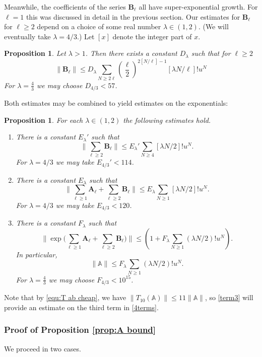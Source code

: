 \documentclass[12pt]{amsart}
\newtheorem{prop}[thm]{Proposition}
\theoremstyle{definition}
\numberwithin{equation}{section}
\newcommand{\bA}{\mathbf{A}}
\newcommand{\bB}{\mathbf{B}}
\theoremstyle{definition} %
\theoremstyle{remark}
\begin{document}
Meanwhile, the coefficients of the series $\bB_\ell$ all have super-exponential growth. For $\ell=1$ this was discussed in detail in the previous section.
Our estimates for $\bB_\ell$ for $\ell\geq 2$ depend on a choice of some real number $\lambda\in (1,2)$. (We will eventually take $\lambda=4/3$.) Let $[x]$ denote the integer part of $x$.

\begin{prop}\label{prop:B bound 2}
    Let $\lambda>1$. Then there exists a constant $D_\lambda$ such that for $\ell\geq 2$
    \[
    \|\bB_\ell\| \leq 
    D_\lambda 
    \sum_{N\geq 2\ell}  \left(\frac{\ell}{2}\right)^{2[N/\ell]-1}
    [\lambda N/\ell]!  u^N 
    \]
For $\lambda = \frac43$ we may choose $D_{4/3}<57$.
\end{prop}

Both estimates may be combined to yield estimates on the exponentials:

\begin{prop}\label{prop:combined}
For each $\lambda \in (1, 2)$ the following estimates hold. 
    \begin{enumerate}
\item There is a constant $E_\lambda'$ such that 
\[
\Big\|\sum_{\ell \geq 2} \bB_\ell\Big\| \leq E_\lambda' \sum_{N\geq 4} [\lambda N/2]! u^N.
\]
For $\lambda=4/3$ we may take $E_{4/3}'<114$.
\item There is a constant $E_\lambda$ 
such that 
\[
\Big\|\sum_{\ell \geq 1} \bA_\ell+ \sum_{\ell \geq 2} \bB_\ell\Big\| 
\leq E_\lambda \sum_{N\geq 1} [\lambda N/2]! u^N.
\]
For $\lambda=4/3$ we may take $E_{4/3} <120$.
\item There is a constant $F_\lambda$ such that 
\[
\Big\|\exp\Big(\sum_{\ell \geq 1} \bA_\ell+ \sum_{\ell \geq 2} \bB_\ell\Big)\Big\|
\leq 
(1+F_\lambda\sum_{N\geq 1} (\lambda N/2)! u^N).
\]
In particular,
\begin{equation} \label{term3}
\|\mathbb{A}\|
\leq 
F_\lambda\sum_{N\geq 1} (\lambda N/2)! u^N.
\end{equation}
For $\lambda=\frac43$ we may choose $F_{4/3} <  10^{15}$.
    \end{enumerate}
\end{prop}
Note that by \eqref{equ:T ab cheap}, we have $\|T_{10}(\mathbb{A})\| \leq 11 \| \mathbb{A} \|$, so \eqref{term3} will provide an estimate on the third term in \eqref{4terms}.
\subsubsection{Proof of Proposition \ref{prop:A bound}}
We proceed in two cases.
\end{document}
